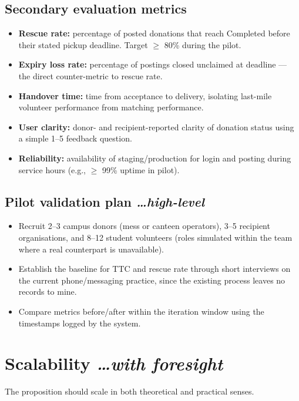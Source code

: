 \documentclass[11pt,a4paper]{article}
\newcommand{\BvrHint}[1]{%
  {\normalfont\normalsize\itshape\hfill #1}}
\begin{document}
\subsection{Secondary evaluation metrics}
\begin{itemize}[leftmargin=0.7cm]
    \item \textbf{Rescue rate:} percentage of posted donations that reach Completed before their stated pickup deadline. Target $\ge$ 80\% during the pilot.
    \item \textbf{Expiry loss rate:} percentage of postings closed unclaimed at deadline --- the direct counter-metric to rescue rate.
    \item \textbf{Handover time:} time from acceptance to delivery, isolating last-mile volunteer performance from matching performance.
    \item \textbf{User clarity:} donor- and recipient-reported clarity of donation status using a simple 1--5 feedback question.
    \item \textbf{Reliability:} availability of staging/production for login and posting during service hours (e.g., $\ge$ 99\% uptime in pilot).
\end{itemize}

\subsection{Pilot validation plan %
\BvrHint{\ldots high-level}}
\begin{itemize}[leftmargin=0.7cm]
    \item Recruit 2--3 campus donors (mess or canteen operators), 3--5 recipient organisations, and 8--12 student volunteers (roles simulated within the team where a real counterpart is unavailable).
    \item Establish the baseline for TTC and rescue rate through short interviews on the current phone/messaging practice, since the existing process leaves no records to mine.
    \item Compare metrics before/after within the iteration window using the timestamps logged by the system.
\end{itemize}

\section{Scalability %
\BvrHint{\ldots with foresight}}
The proposition should scale in both theoretical and practical senses.
\end{document}
